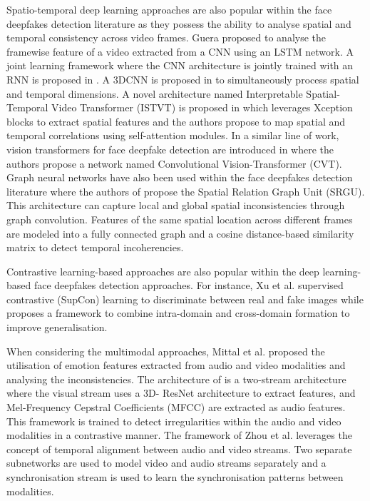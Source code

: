 Spatio-temporal deep learning approaches are also popular within the face deepfakes detection literature as they possess the ability to analyse spatial and temporal consistency across video frames. Guera \cite{guera2018deepfake} proposed to analyse the framewise feature of a video extracted from a CNN using an LSTM network. A joint learning framework where the CNN architecture is jointly trained with an RNN is proposed in \cite{sabir2019recurrent}. A 3DCNN is proposed in \cite{nguyen2021learning} to simultaneously process spatial and temporal dimensions. A novel architecture named Interpretable Spatial-Temporal Video Transformer (ISTVT) is proposed in \cite{zhao2023istvt} which leverages  Xception blocks to extract spatial features and the authors propose to map spatial and temporal correlations using self-attention modules. In a similar line of work, vision transformers for face deepfake detection are introduced in \cite{wodajo2021deepfake} where the authors propose a network named  Convolutional Vision-Transformer (CVT). Graph neural networks have also been used within the face deepfakes detection literature where the authors of \cite{shang2023constructing} propose the Spatial Relation Graph Unit (SRGU). This architecture can capture local and global spatial inconsistencies through graph convolution. Features of the same spatial location across different frames are modeled into a fully connected graph and a cosine distance-based similarity matrix to detect temporal incoherencies. 

Contrastive learning-based approaches are also popular within the deep learning-based face deepfakes detection approaches. For instance, Xu et al. \cite{xu2022supervised} supervised contrastive (SupCon) learning to discriminate between real and fake images while \cite{dong2023contrastive} proposes a framework to combine intra-domain and cross-domain formation to improve generalisation. 

When considering the multimodal approaches, Mittal et al. \cite{mittal2020emotions} proposed the utilisation of emotion features extracted from audio and video modalities and analysing the inconsistencies. The architecture of \cite{chugh2020not} is a two-stream architecture where the visual stream uses a 3D- ResNet architecture to extract features, and Mel-Frequency Cepstral Coefficients (MFCC) are extracted as audio features. This framework is trained to detect irregularities within the audio and video modalities in a contrastive manner. The framework of Zhou et al. \cite{zhou2021joint} leverages the concept of temporal alignment between audio and video streams. Two separate subnetworks are used to model video and audio streams separately and a synchronisation stream is used to learn the synchronisation patterns between modalities. 

